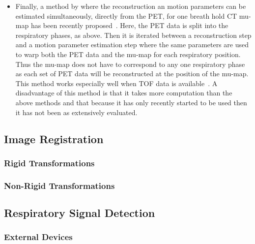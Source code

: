 \begin{itemize}
                \item Finally, a method by where the reconstruction an motion parameters can be estimated simultaneously, directly from the \gls{PET}, for one breath hold \gls{CT} \gls{mu-map} has been recently proposed~. Here, the \gls{PET} data is split into the respiratory phases, as above. Then it is iterated between a reconstruction step and a motion parameter estimation step where the same parameters are used to warp both the \gls{PET} data and the \gls{mu-map} for each respiratory position. Thus the \gls{mu-map} does not have to correspond to any one respiratory phase as each set of \gls{PET} data will be reconstructed at the position of the \gls{mu-map}. This method works especially well when \gls{TOF} data is available~. A disadvantage of this method is that it takes more computation than the above methods and that because it has only recently started to be used then it has not been as extensively evaluated.
            \end{itemize}
    
        
    
        \subsection{Image Registration} \label{sec:image_registration}
            
            
            \subsubsection{Rigid Transformations} \label{sec:rigid_transformations}
                
                
            \subsubsection{Non-Rigid Transformations} \label{sec:non_rigid_transformations}
                
            
        \subsection{Respiratory Signal Detection} \label{sec:respiratory_signal_detection}
            
            
            \subsubsection{External Devices} \label{sec:external_devices}
                

